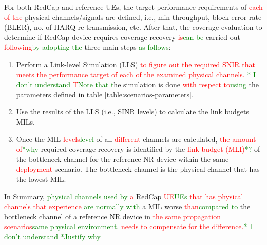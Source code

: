 \documentclass[]{IEEEtran}
\newcommand{\CAREPL}[2]{\textcolor{red}{#1}\textcolor{green}{#2}}
\begin{document}
For both RedCap and reference UEs, the target performance requirements of \CAREPL{each of the}{} physical channels/signals are defined, i.e., min throughput, block error rate (BLER), no. of HARQ re-transmission, etc. 
After that, the coverage evaluation to determine if RedCap device requires coverage recovery \CAREPL{is}{can be} carried out \CAREPL{ following}{by adopting the} three main steps \CAREPL{}{as follows}:
\begin{enumerate}
    \item  Perform a Link-level Simulation (LLS)  \CAREPL{to figure out the required SNIR that meets the performance target of each of the examined physical channels. }{* I don't understand}
    \CAREPL{T}{Note that t}he simulation is done \CAREPL{with respect to}{using} the parameters defined in table \ref{table:scenarios-parameters}.
    \item Use the results of the LLS (i.e., SINR levels) to calculate the link budgets MILs.
    \item Once the MIL \CAREPL{levels}{level} of all \CAREPL{different}{} channels are calculated, \CAREPL{the amount of}{*why} required coverage recovery is identified by the \CAREPL{link budget (MLI)}{*?} of the bottleneck channel for the reference NR device within the same \CAREPL{deployment}{} scenario. The bottleneck channel is the physical channel that has the lowest MIL.
\end{enumerate}
In Summary, \CAREPL{}{physical channels used by} \CAREPL{a}{} RedCap \CAREPL{UE}{UEs} \CAREPL{that has physical channels that experience}{ are normally with} a MIL worse \CAREPL{than}{compared to} the bottleneck channel of a reference NR device in \CAREPL{the same propagation scenarios}{same physical environment}. \CAREPL{needs to compensate for the difference.}{* I don't understand}
\CAREPL{}{*Justify why}
\end{document}
